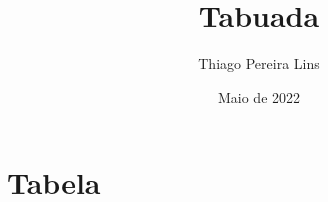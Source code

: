\documentclass[a4paper]{article}
\title{Tabuada}
\author{Thiago Pereira Lins}
\date{Maio de 2022}
\begin{document}
    \maketitle

    \section{Tabela}

        
\end{document}
